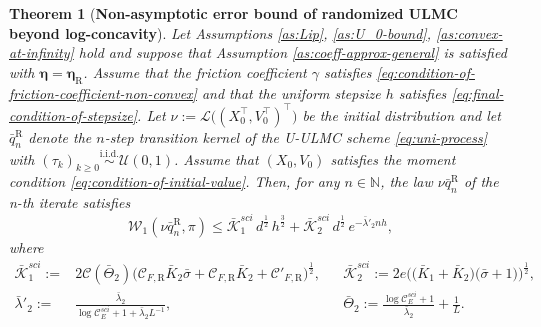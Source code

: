 \documentclass[12pt]{article}
\numberwithin{equation}{section}
\newcommand{\N}{\mathbb{N}}
\newtheorem{thm}{Theorem}[section]
\begin{document}
\begin{thm}[\textbf{Non-asymptotic error bound of randomized ULMC beyond log-concavity}] 
\label{thm:non-convex-main-result}
Let Assumptions \ref{as:Lip}, \ref{as:U_0-bound}, \ref{as:convex-at-infinity} hold and suppose that Assumption \ref{as:coeff-approx-general} is satisfied with $\boldsymbol{\eta}=\boldsymbol{\eta}_\mathrm{R}$. Assume that the friction coefficient \(\gamma\) satisfies \eqref{eq:condition-of-friction-coefficient-non-convex} and that the uniform stepsize \(h\) satisfies \eqref{eq:final-condition-of-stepsize}.
Let
\(
\nu:=\mathcal L\big((X_0^\top,V_0^\top)^\top\big)
\)
be the initial distribution and let \(\bar q^\mathrm{R}_n\) denote the \(n\)-step transition kernel of the U-ULMC scheme \eqref{eq:uni-process} with $(\tau_k)_{k\ge 0}\overset{\text{i.i.d.}}{\sim}\mathcal U(0,1)$.  
Assume that \((X_0,V_0)\) satisfies the moment condition \eqref{eq:condition-of-initial-value}.
Then, for any $n \in  \N$, the law $\nu \bar{q}^\mathrm{R}_n$ of the n-th iterate satisfies
\begin{equation}
        \mathcal{W}_{1}(\nu \bar q^\mathrm{R}_n,\pi)
        \leq
        \bar{\mathcal{K}}_1^{sci}\, 
        d^{\frac{1}{2}}\,
        h^{\frac{3}{2}}
        +
        \bar{\mathcal{K}}^{sci}_2\,
        d^{\frac{1}{2}}\,
        e^{-\bar \lambda'_2  n h},
\end{equation}
where
    \begin{align}\label{eq:define-non-asym-constants-nonconvex}
    \bar{\mathcal K}^{sci}_1
    :=  &
    2
    \mathcal C(\bar \Theta_2)
    \big(
    \mathcal C_{F,\mathrm{R}} \bar K_2 
    \bar{\sigma}
    +
    \mathcal C_{F,\mathrm{R}}\bar K_2+ \mathcal C'_{F,\mathrm{R}}
    \big)^{\frac{1}{2}}
    ,  
    & &
    \bar{\mathcal K}^{sci}_2
    :=  
    2e
    \Big(
        \big(
        \bar K_1
        +
        \bar K_2
        \big)
        \big(
        \bar{\sigma}
        +
        1
        \big)
    \Big)^{\frac{1}{2}}
    ,
    \\ 
    \bar \lambda'_2 
    :=  &
    \tfrac{\bar \lambda_2 }{\log \mathcal C^{sci}_E+1+ \bar \lambda_2 L^{-1}}
    ,
    & &
    \bar \Theta_2
      :=     
    \tfrac{\log \mathcal C^{sci}_E + 1}{\bar \lambda_2}
    +
    \tfrac1 L
    .
    \end{align}
\end{thm}
\end{document}
